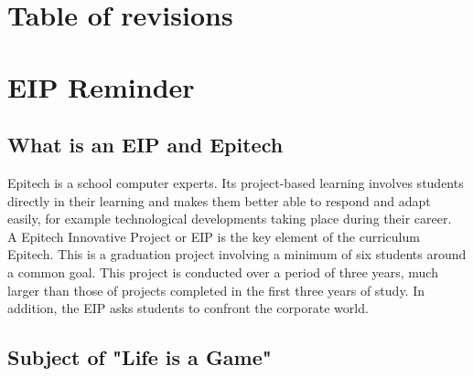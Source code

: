 \documentclass{life-fr}
\begin{document}
\chapter*{Table of revisions}

\listofrevisions

\newpage
\hspace{2cm}
\newpage

\tableofcontents

\newpage
\hspace{2cm}
\newpage

\chapter{EIP Reminder}
\section{What is an EIP and Epitech}

Epitech is a school computer experts. Its project-based learning involves students directly in their learning and makes them better able to respond and adapt easily, for example technological developments taking place during their career.\\

A Epitech Innovative Project or EIP is the key element of the curriculum Epitech. This is a graduation project involving a minimum of six students around a common goal. This project is conducted over a period of three years, much larger than those of projects completed in the first three years of study. In addition, the EIP asks students to confront the corporate world.

\section{Subject of "Life is a Game"}
\end{document}
